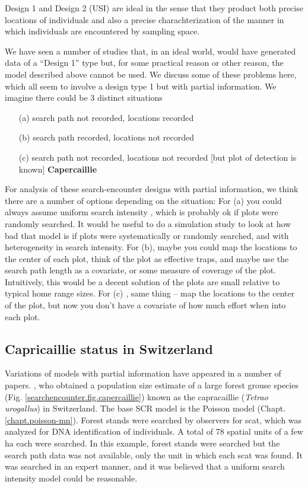 Design 1 and Design 2 (USI) are ideal in the sense that they product
both precise locations of individuals and also a precise
charachterization of the manner in which individuals are encountered
by sampling space. 

We have seen a number of studies that, in an ideal world, would have
generated data of a ``Design
1'' type but, for some practical reason or other reason, the model described
above cannot be used.
 We discuss some of these problems here, which all seem to involve a
 design type 1 but with partial information. We imagine there could be
 3 distinct situations
\begin{itemize}
\item[(a)] search path not recorded, locations recorded
\item[(b)] search path recorded, locations not recorded
\item[(c)] search path not recorded, locations not recorded [but plot of
detection is known]  {\bf Capercaillie}
\end{itemize}

For analysis of these search-encounter designs with partial information,
we think there are a number of options depending on the situation:
For (a) you could always assume uniform search intensity ,
which is probably ok if plots were randomly searched.
It would be useful to do a simulation study to look at how bad that
model is if plots were systematically or randomly searched, and with
heterogeneity in search intensity.
For (b), maybe you could map the locations to the center of each plot,
think of the plot as effective traps, and maybe use the search path
length as a covariate, or some measure of coverage of the
plot. Intuitively, this would be a decent solution of the plots are
small relative to typical home range sizes.
For (c) , same thing -- map the locations to the center of the plot,
but now you don't have a covariate of how much effort when into each
plot.


\subsection{Capricaillie status in Switzerland}

Variations of models with partial information  have appeared in a
number of papers.  
\citet{mollet_etal:2012}, who obtained a population size estimate of a
large forest grouse species 
(Fig. \ref{searchencounter.fig.capercaillie})
known as the capracaillie ({\it Tetrao
  urogallus}) in Switzerland.  The base SCR model is the Poisson model
(Chapt. \ref{chapt.poisson-mn}). Forest stands were searched by
observers for scat, which was analyzed for DNA identification of
individuals.  A total of 78 spatial units of a few ha each were
searched.  In this example, forest stands were searched but the search
path data was not available, only the unit in which each scat was
found.  It was searched in an expert manner, and it was believed that
a uniform search intensity model could be reasonable.  

